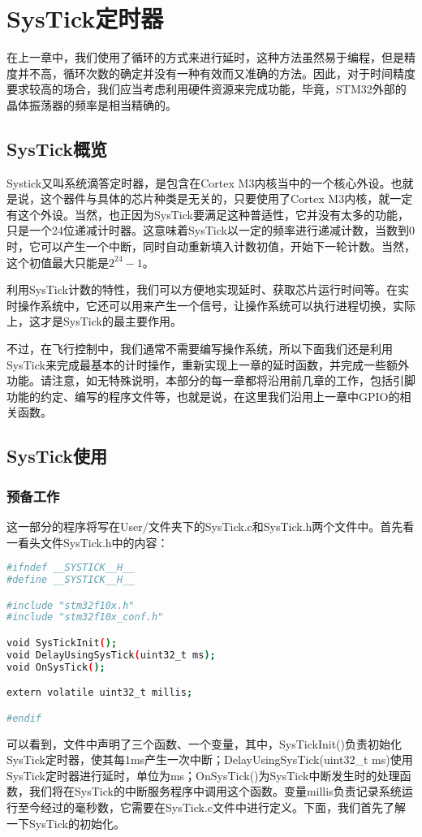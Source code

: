 \renewenvironment{longtable}{\rowcolors{2}{LightGray}{white}\oldlongtable} {\endoldlongtable}
\chapter{SysTick定时器}

在上一章中，我们使用了循环的方式来进行延时，这种方法虽然易于编程，但是精度并不高，循环次数的确定并没有一种有效而又准确的方法。因此，对于时间精度要求较高的场合，我们应当考虑利用硬件资源来完成功能，毕竟，STM32外部的晶体振荡器的频率是相当精确的。

\section{SysTick概览}
Systick又叫系统滴答定时器，是包含在Cortex M3内核当中的一个核心外设。也就是说，这个器件与具体的芯片种类是无关的，只要使用了Cortex M3内核，就一定有这个外设。当然，也正因为SysTick要满足这种普适性，它并没有太多的功能，只是一个24位递减计时器。这意味着SysTick以一定的频率进行递减计数，当数到0时，它可以产生一个中断，同时自动重新填入计数初值，开始下一轮计数。当然，这个初值最大只能是$2^{24}-1$。
\par 
利用SysTick计数的特性，我们可以方便地实现延时、获取芯片运行时间等。在实时操作系统中，它还可以用来产生一个信号，让操作系统可以执行进程切换，实际上，这才是SysTick的最主要作用。
\par 
不过，在飞行控制中，我们通常不需要编写操作系统，所以下面我们还是利用SysTick来完成最基本的计时操作，重新实现上一章的延时函数，并完成一些额外功能。请注意，如无特殊说明，本部分的每一章都将沿用前几章的工作，包括引脚功能的约定、编写的程序文件等，也就是说，在这里我们沿用上一章中GPIO的相关函数。

\section{SysTick使用}
	\subsection{预备工作}
	这一部分的程序将写在User/文件夹下的SysTick.c和SysTick.h两个文件中。首先看一看头文件SysTick.h中的内容：
	\par 
	\begin{lstlisting}[language=bash, style=customStyleC, caption=SysTick.h]
#ifndef __SYSTICK__H__
#define __SYSTICK__H__

#include "stm32f10x.h" 
#include "stm32f10x_conf.h" 

void SysTickInit();
void DelayUsingSysTick(uint32_t ms);
void OnSysTick();

extern volatile uint32_t millis;

#endif
	\end{lstlisting}
	\par 
	可以看到，文件中声明了三个函数、一个变量，其中，SysTickInit()负责初始化SysTick定时器，使其每1ms产生一次中断；DelayUsingSysTick(uint32\_t ms)使用SysTick定时器进行延时，单位为ms；OnSysTick()为SysTick中断发生时的处理函数，我们将在SysTick的中断服务程序中调用这个函数。变量millis负责记录系统运行至今经过的毫秒数，它需要在SysTick.c文件中进行定义。下面，我们首先了解一下SysTick的初始化。
	
